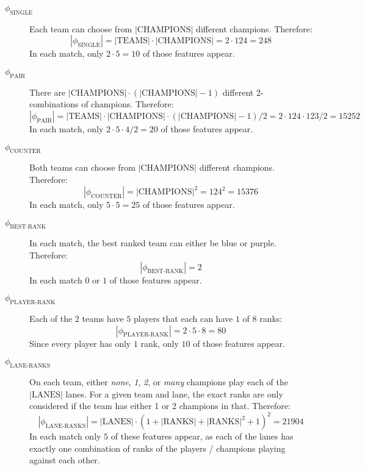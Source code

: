 \begin{description}
\item[{$\phi_{\text{SINGLE}}$}]\hfill
 
Each team can choose from $|\text{CHAMPIONS}|$ different champions. Therefore:
    \[|\phi_{\text{SINGLE}}| = |\text{TEAMS}| \cdot |\text{CHAMPIONS}| = 2 \cdot 124 = 248\] In each match, only $2 \cdot 5 = 10$ of those features appear.


\item[{$\phi_{\text{PAIR}}$}]\hfill

There are $|\text{CHAMPIONS}| \cdot (|\text{CHAMPIONS}|-1)$ different 2-combinations of champions. Therefore:
    \[|\phi_{\text{PAIR}}| = |\text{TEAMS}| \cdot |\text{CHAMPIONS}| \cdot (|\text{CHAMPIONS}|-1) / 2 = 2 \cdot 124 \cdot 123 / 2 = 15252\] In each match, only $2 \cdot 5 \cdot 4 / 2 = 20$ of those features appear.


\item[{$\phi_{\text{COUNTER}}$}]\hfill

 Both teams can choose from $|\text{CHAMPIONS}|$ different champions. Therefore:
\[|\phi_{\text{COUNTER}}| = |\text{CHAMPIONS}|^2 = 124^2 = 15376\] 
In each match, only $5 \cdot 5 = 25$ of those features appear.


\item[{$\phi_{\text{BEST-RANK}}$}]\hfill

 In each match, the best ranked team can either be blue or purple. Therefore:
\[|\phi_{\text{BEST-RANK}}| = 2\] 
In each match $0$ or $1$ of those features appear.

\item[{$\phi_{\text{PLAYER-RANK}}$}]\hfill

Each of the $2$ teams have $5$ players that each can have $1$ of $8$ ranks:
\[|\phi_{\text{PLAYER-RANK}}| = 2 \cdot 5 \cdot 8 = 80\] 
Since every player has only $1$ rank, only $10$ of those features appear.


\item[{$\phi_{\text{LANE-RANKS}}$}]\hfill

 On each team, either \textit{none}, \textit{1}, \textit{2}, or \textit{many} champions play each of the $|\text{LANES}|$ lanes. For a given team and lane, the exact ranks are only considered if the team has either 1 or 2 champions in that. Therefore:
\[|\phi_{\text{LANE-RANKS}}| = |\text{LANES}| \cdot (1 + |\text{RANKS}| + |\text{RANKS}|^2 + 1)^2 = 21904\]
In each match only $5$ of these features appear, as each of the lanes has exactly one combination of ranks of the players / champions playing against each other.



\end{description}
